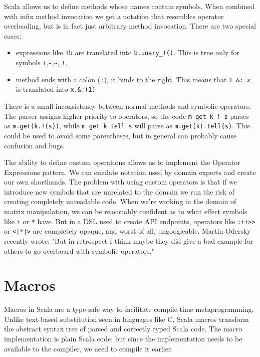 Scala allows us to define methods whose names contain symbols. When combined with infix method invocation we get a notation that resembles operator overloading, but is in fact just arbitrary method invocation. There are two special cases: 
\begin{itemize}
	\item expressions like \texttt{!b} are translated into \texttt{b.unary_!()}. This is true only for symbols \texttt{+},\texttt{-},\texttt{\~}, \texttt{!}.
	\item method ends with a colon (\texttt{:}), it binds to the right. This means that \texttt{1 &: x} is translated into \texttt{x.&:(1)}
\end{itemize}

There is a small inconsistency between normal methods and symbolic operators. The parser assigns higher priority to operators, so the code \texttt{m get k ! s} parses as \texttt{m.get(k.!(s))}, while \texttt{m get k tell s} will parse as \texttt{m.get(k).tell(s)}. This could be used to avoid some parentheses, but in general can probably cause confusion and bugs.

The ability to define custom operations allows us to implement the Operator Expressions pattern. We can emulate notation used by domain experts and create our own shorthands. The problem with using custom operators is that if we introduce new symbols that are unrelated to the domain we run the risk of creating completely unreadable code. When we're working in the domain of matrix manipulation, we can be reasonably confident as to what effect symbols like \texttt{+} or \texttt{*} have. But in a DSL used to create API endpoints, operators like \texttt{:++>>} or \texttt{<|*|>} are completely opaque, and worst of all, ungoogleable. Martin Odersky recently wrote: "But in retrospect I think maybe they did give a bad example for others to go overboard with symbolic operators." \autocite{Odersky:2016}


\section{Macros}

Macros in Scala are a type-safe way to facilitate compile-time metaprogramming. Unlike text-based substitution seen in languages like C, Scala macros transform the abstract syntax tree of parsed and correctly typed Scala code. The macro implementation is plain Scala code, but since the implementation needs to be available to the compiler, we need to compile it earlier.

